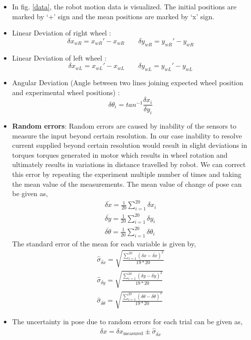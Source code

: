 \documentclass[11pt,a4paper,openright,twoside]{extreport}
\begin{document}
\begin{itemize}
\item In fig. \ref{data}, the robot motion data is visualized. The initial positions are marked by `+' sign and the mean positions are marked by `x' sign.
\item Linear Deviation of right wheel : 
	$$\delta x_{wR} = x_{wR}' - x_{wR} \qquad \delta y_{wR} = y_{wR}' - y_{wR}$$
\item Linear Deviation of left wheel : 
	$$\delta x_{wL} = x_{wL}' - x_{wL} \qquad \delta y_{wL} = y_{wL}' - y_{wL}$$
\item Angular Deviation (Angle between two lines joining expected wheel position and experimental wheel positions) : 
	$$\delta \theta_i = tan^{-1}\frac{\delta x_{i}}{\delta y_{i}}$$
\item \textbf{Random errors}: Random errors are caused by inability of the sensors to measure the input beyond certain resolution. In our case inability to resolve current supplied beyond certain resolution would result in slight deviations in torques torques generated in motor which results in wheel rotation and ultimately results in variations in distance travelled by robot. We can correct this error by repeating the experiment multiple number of times and taking the mean value of the measurements. The mean value of change of pose can be given as,
\begin{align*}
\overline{\delta x} = \frac{1}{20} \sum_{i=1}^{20} \delta x_i \\
\overline{\delta y} = \frac{1}{20} \sum_{i=1}^{20} \delta y_i \\
\overline{\delta \theta} = \frac{1}{20} \sum_{i=1}^{20} \delta \theta_i
\end{align*}
The standard error of the mean for each variable is given by,
\begin{align*}
\hat{\sigma}_{\overline{\delta x}} = \sqrt{\frac{\sum_{i=1}^{20} (\delta x - \overline{\delta x})^2}{19 * 20}} \\
\hat{\sigma}_{\overline{\delta y}} = \sqrt{\frac{\sum_{i=1}^{20} (\delta y - \overline{\delta y})^2}{19 * 20}} \\
\hat{\sigma}_{\overline{\delta \theta}} = \sqrt{\frac{\sum_{i=1}^{20} (\delta \theta - \overline{\delta \theta})^2}{19 * 20}}
\end{align*}
\item The uncertainty in pose due to random errors for each trial can be given as,
\begin{align*}
\delta x = \delta x_{\text{measured}} \pm \hat{\sigma}_{\overline{\delta x}} \\

\end{align*}
\end{itemize}
\end{document}
